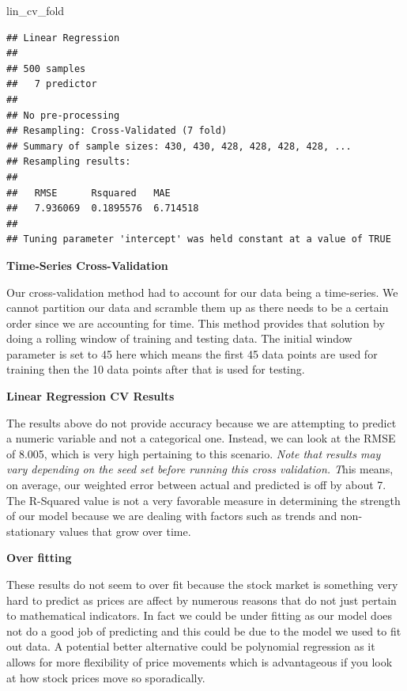 \documentclass[
]{article}
\newenvironment{Shaded}{\begin{snugshade}}{\end{snugshade}}
\newcommand{\NormalTok}[1]{#1}
\begin{document}
\begin{Shaded}
\begin{Highlighting}[]
\NormalTok{lin\_cv\_fold}
\end{Highlighting}
\end{Shaded}

\begin{verbatim}
## Linear Regression 
## 
## 500 samples
##   7 predictor
## 
## No pre-processing
## Resampling: Cross-Validated (7 fold) 
## Summary of sample sizes: 430, 430, 428, 428, 428, 428, ... 
## Resampling results:
## 
##   RMSE      Rsquared   MAE     
##   7.936069  0.1895576  6.714518
## 
## Tuning parameter 'intercept' was held constant at a value of TRUE
\end{verbatim}

\textbf{Time-Series Cross-Validation}

Our cross-validation method had to account for our data being a
time-series. We cannot partition our data and scramble them up as there
needs to be a certain order since we are accounting for time. This
method provides that solution by doing a rolling window of training and
testing data. The initial window parameter is set to 45 here which means
the first 45 data points are used for training then the 10 data points
after that is used for testing.

\textbf{Linear Regression CV Results}

The results above do not provide accuracy because we are attempting to
predict a numeric variable and not a categorical one. Instead, we can
look at the RMSE of 8.005, which is very high pertaining to this
scenario. \emph{Note that results may vary depending on the seed set
before running this cross validation. T}his means, on average, our
weighted error between actual and predicted is off by about 7. The
R-Squared value is not a very favorable measure in determining the
strength of our model because we are dealing with factors such as trends
and non-stationary values that grow over time.

\textbf{Over fitting}

These results do not seem to over fit because the stock market is
something very hard to predict as prices are affect by numerous reasons
that do not just pertain to mathematical indicators. In fact we could be
under fitting as our model does not do a good job of predicting and this
could be due to the model we used to fit out data. A potential better
alternative could be polynomial regression as it allows for more
flexibility of price movements which is advantageous if you look at how
stock prices move so sporadically.
\end{document}
